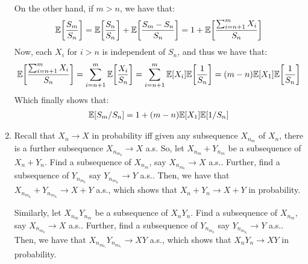 \documentclass[12pt]{article}
\theoremstyle{definitionstyle}
\newcommand{\1}{\mathds 1}
\newcommand{\E}{\mathbb E \qty}
\begin{document}
\begin{enumerate}
        On the other hand, if $m > n$, we have that:
        \begin{align*}
            \E[\frac{S_m}{S_n}] = \E[\frac{S_n}{S_n}] + \E[\frac{S_m - S_n}{S_n}] = 1 + \E[\frac{\sum_{i=n+1}^m X_i}{S_n}]
        \end{align*}
        Now, each $X_i$ for $i > n$ is independent of $S_n$, and thus we have that:
        \begin{align*}
            \E[\frac{\sum_{i=n+1}^m X_i}{S_n}] = \sum_{i=n+1}^m \E[\frac{X_i}{S_n}] = \sum_{i=n+1}^m \E[X_i]\E[\frac{1}{S_n}] = (m-n)\E[X_1]\E[\frac{1}{S_n}]
        \end{align*}
        Which finally shows that:
        \begin{align*}
            \E[S_m/S_n] = 1 + (m-n)\E[X_1]\E[1/S_n]
        \end{align*}

        \item Recall that $X_n \to X$ in probability iff given any subsequence $X_{n_m}$ of $X_n$, there is a further subsequence $X_{n_{m_k}} \to X$ a.s. So, let $X_{n_m} + Y_{n_m}$ be a subsequence of $X_n+Y_n$. Find a subsequence of $X_{n_m}$, say $X_{n_{m_k}} \to X$ a.s.. Further, find a subsequence of $Y_{n_{m_k}}$ say $Y_{n_{m_{k_l}}} \to Y$ a.s.. Then, we have that $X_{n_{m_{k_l}}} + Y_{n_{m_{k_l}}} \to X+Y$ a.s., which shows that $X_n+Y_n \to X +Y$ in probability.

        Similarly, let $X_{n_m}Y_{n_m}$ be a subsequence of $X_nY_n$. Find a subsequence of $X_{n_m}$, say $X_{n_{m_k}} \to X$ a.s.. Further, find a subsequence of $Y_{n_{m_k}}$ say $Y_{n_{m_{k_l}}} \to Y$ a.s.. Then, we have that $X_{n_{m_{k_l}}}Y_{n_{m_{k_l}}} \to XY$ a.s., which shows that $X_nY_n \to XY$ in probability.


\end{enumerate}
\end{document}
